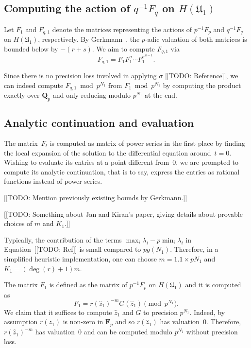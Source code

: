 \subsection{Computing the action of $q^{-1} F_q$ on $H(\mathfrak{U}_1)$}

Let $F_1$ and $F_{q,1}$ denote the matrices representing the 
actions of $p^{-1} F_p$ and $q^{-1} F_q$ on $H(\mathfrak{U}_1)$, 
respectively.  By Gerkmann~\citep[Lemma~3.3]{Gerkmann2007}, 
the $p$-adic valuation of both matrices is bounded below by $-(r+s)$.  
We aim to compute $F_{q,1}$ via 
\begin{equation*}
F_{q,1} = F_1 F_1^{\sigma} \dotsm F_1^{\sigma^{a-1}}.
\end{equation*}

Since there is no precision loss involved in applying $\sigma$ [[TODO: Reference]], 
we can indeed compute $F_{q,1} \bmod p^{N_1}$ from $F_1 \bmod p^{N_1}$ 
by computing the product exactly over $\mathbf{Q}_p$ and only reducing 
modulo $p^{N_1}$ at the end.

\subsection{Analytic continuation and evaluation}

The matrix~$F_t$ is computed as matrix of power series in the first place 
by finding the local expansion of the solution to the differential equation 
around~$t = 0$.  Wishing to evaluate its entries at a point different 
from~$0$, we are prompted to compute its analytic continuation, that is to say, 
express the entries as rational functions instead of power series.

[[TODO:  Mention previously existing bounds by Gerkmann.]]

[[TODO:  Something about Jan and Kiran's paper, giving details about 
provable choices of $m$ and $K_1$.]]

\begin{rem}
Typically, the contribution of the terms 
$\max_i \lambda_i - p \min_i \lambda_i$ in Equation~[[TODO: Ref]] is small 
compared to $p g(N_1)$.  Therefore, in a simplified heuristic implementation, 
one can choose $m = 1.1 \times p N_1$ and $K_1 = (\deg(r) + 1) m$.
\end{rem}

The matrix $F_1$ is defined as the matrix of $p^{-1} F_p$ 
on $H(\mathfrak{U}_1)$ and it is computed as 
\begin{equation*}
F_1 = r(\hat{z}_1)^{-m} G(\hat{z}_1) \pmod{p^{N_1}}.
\end{equation*}
We claim that it suffices to compute 
$\hat{z}_1$ and $G$ to precision $p^{N_1}$.  Indeed, by 
assumption $r(z_1)$ is non-zero in $\mathbf{F}_p$ and so 
$r(\hat{z}_1)$ has valuation~$0$.  Therefore, $r(\hat{z}_1)^{-m}$ 
has valuation~$0$ and can be computed modulo $p^{N_1}$ 
without precision loss.

